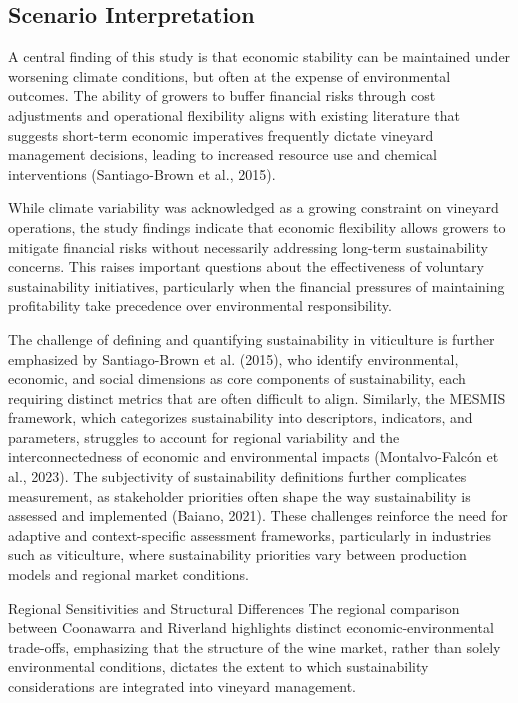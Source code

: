 \documentclass{article}
\begin{document}
\subsection{Scenario Interpretation}
A central finding of this study is that economic stability can be maintained under worsening climate conditions, but often at the expense of environmental outcomes. The ability of growers to buffer financial risks through cost adjustments and operational flexibility aligns with existing literature that suggests short-term economic imperatives frequently dictate vineyard management decisions, leading to increased resource use and chemical interventions (Santiago-Brown et al., 2015).

While climate variability was acknowledged as a growing constraint on vineyard operations, the study findings indicate that economic flexibility allows growers to mitigate financial risks without necessarily addressing long-term sustainability concerns. This raises important questions about the effectiveness of voluntary sustainability initiatives, particularly when the financial pressures of maintaining profitability take precedence over environmental responsibility.

The challenge of defining and quantifying sustainability in viticulture is further emphasized by Santiago-Brown et al. (2015), who identify environmental, economic, and social dimensions as core components of sustainability, each requiring distinct metrics that are often difficult to align. Similarly, the MESMIS framework, which categorizes sustainability into descriptors, indicators, and parameters, struggles to account for regional variability and the interconnectedness of economic and environmental impacts (Montalvo-Falcón et al., 2023). The subjectivity of sustainability definitions further complicates measurement, as stakeholder priorities often shape the way sustainability is assessed and implemented (Baiano, 2021). These challenges reinforce the need for adaptive and context-specific assessment frameworks, particularly in industries such as viticulture, where sustainability priorities vary between production models and regional market conditions.

Regional Sensitivities and Structural Differences
The regional comparison between Coonawarra and Riverland highlights distinct economic-environmental trade-offs, emphasizing that the structure of the wine market, rather than solely environmental conditions, dictates the extent to which sustainability considerations are integrated into vineyard management.
\end{document}

